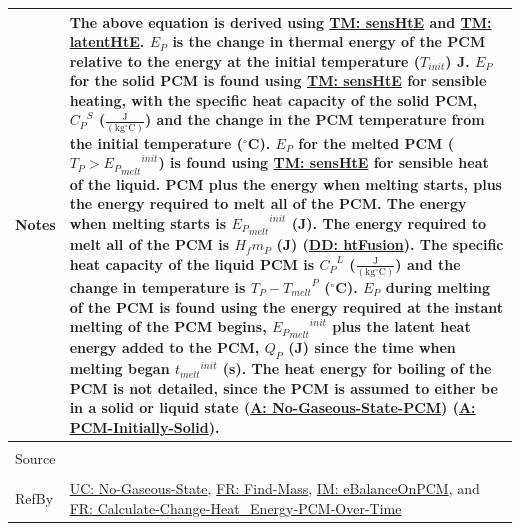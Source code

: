 \documentclass[12pt]{article}
\begin{document}
\begin{minipage}{\textwidth}
\begin{tabular}{p{} p{}}
Notes & The above equation is derived using \hyperref[TM:sensHtE]{TM: sensHtE} and \hyperref[TM:latentHtE]{TM: latentHtE}. ${E_{P}}$ is the change in thermal energy of the PCM relative to the energy at the initial temperature (${T_{init}}$) J. ${E_{P}}$ for the solid PCM is found using \hyperref[TM:sensHtE]{TM: sensHtE} for sensible heating, with the specific heat capacity of the solid PCM, ${{C_{P}}^{S}}$ ($\frac{\text{J}}{(\text{kg}{}^{\circ}\text{C})}$) and the change in the PCM temperature from the initial temperature (${}^{\circ}$C). ${E_{P}}$ for the melted PCM (${T_{P}}>{{{E_{P}}_{melt}}^{init}}$) is found using \hyperref[TM:sensHtE]{TM: sensHtE} for sensible heat of the liquid. PCM plus the energy when melting starts, plus the energy required to melt all of the PCM. The energy when melting starts is ${{{E_{P}}_{melt}}^{init}}$ (J). The energy required to melt all of the PCM is ${H_{f}} {m_{P}}$ (J) (\hyperref[DD:htFusion]{DD: htFusion}). The specific heat capacity of the liquid PCM is ${{C_{P}}^{L}}$ ($\frac{\text{J}}{(\text{kg}{}^{\circ}\text{C})}$) and the change in temperature is ${T_{P}}-{{T_{melt}}^{P}}$ (${}^{\circ}$C). ${E_{P}}$ during melting of the PCM is found using the energy required at the instant melting of the PCM begins, ${{{E_{P}}_{melt}}^{init}}$ plus the latent heat energy added to the PCM, ${Q_{P}}$ (J) since the time when melting began ${{t_{melt}}^{init}}$ (s). The heat energy for boiling of the PCM is not detailed, since the PCM is assumed to either be in a solid or liquid state (\hyperref[assumpNGSP]{A: No-Gaseous-State-PCM}) (\hyperref[assumpPIS]{A: PCM-Initially-Solid}).
\\ \midrule \\
Source & \cite{koothoor2013}
\\ \midrule \\
RefBy & \hyperref[unlikeChgNGS]{UC: No-Gaseous-State}, \hyperref[findMass]{FR: Find-Mass}, \hyperref[IM:eBalanceOnPCM]{IM: eBalanceOnPCM}, and \hyperref[calcChgHeatEnergyPCMOverTime]{FR: Calculate-Change-Heat\_Energy-PCM-Over-Time}
\\ \bottomrule \end{tabular}
\end{minipage}
\end{document}
